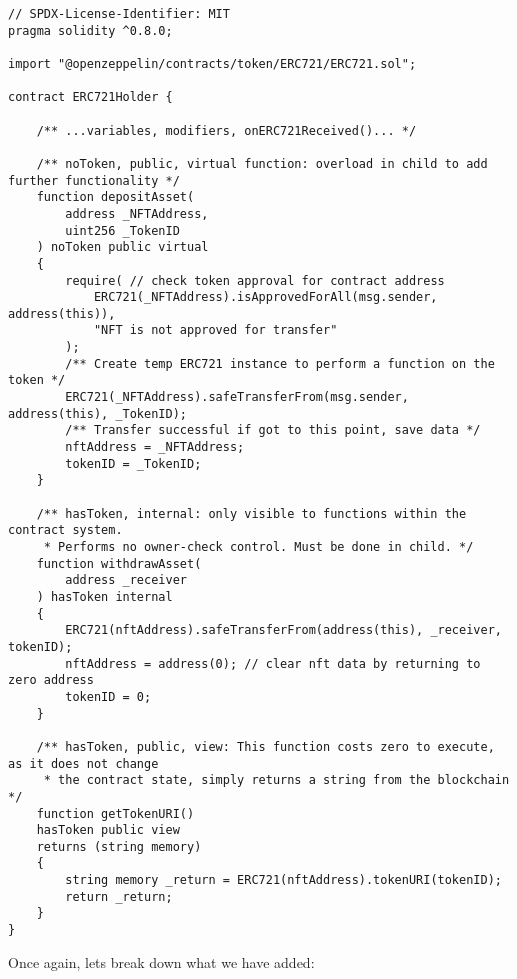 \documentclass{article}
\theoremstyle{theorem}
\theoremstyle{definition}
\theoremstyle{remark}
\begin{document}
\begin{itemize}
\begin{lstlisting}
// SPDX-License-Identifier: MIT
pragma solidity ^0.8.0;

import "@openzeppelin/contracts/token/ERC721/ERC721.sol";

contract ERC721Holder {

    /** ...variables, modifiers, onERC721Received()... */
    
    /** noToken, public, virtual function: overload in child to add further functionality */
    function depositAsset(
        address _NFTAddress, 
        uint256 _TokenID
    ) noToken public virtual
    {
        require( // check token approval for contract address
            ERC721(_NFTAddress).isApprovedForAll(msg.sender, address(this)), 
            "NFT is not approved for transfer"
        ); 
        /** Create temp ERC721 instance to perform a function on the token */
        ERC721(_NFTAddress).safeTransferFrom(msg.sender, address(this), _TokenID);
        /** Transfer successful if got to this point, save data */
        nftAddress = _NFTAddress;
        tokenID = _TokenID;
    }
    
    /** hasToken, internal: only visible to functions within the contract system.
     * Performs no owner-check control. Must be done in child. */
    function withdrawAsset(
        address _receiver
    ) hasToken internal
    {
        ERC721(nftAddress).safeTransferFrom(address(this), _receiver, tokenID);
        nftAddress = address(0); // clear nft data by returning to zero address
        tokenID = 0;
    }
    
    /** hasToken, public, view: This function costs zero to execute, as it does not change 
     * the contract state, simply returns a string from the blockchain */
    function getTokenURI() 
    hasToken public view 
    returns (string memory)
    {
        string memory _return = ERC721(nftAddress).tokenURI(tokenID);
        return _return;
    }
}
\end{lstlisting}
\end{itemize}

\medskip\noindent
Once again, lets break down what we have added:
\end{document}
